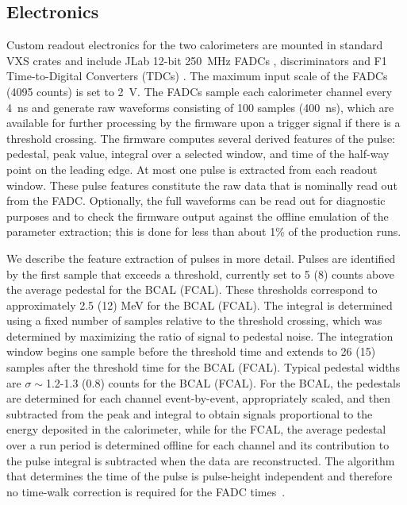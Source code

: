 \subsection{Electronics \label{sec:calelectronics}}
Custom readout electronics for the two calorimeters are mounted in standard VXS crates and include 
JLab 12-bit 250~MHz FADCs \cite{hdnote1022}, discriminators \cite{hdnote2511} and F1 Time-to-Digital Converters (TDCs) \cite{hdnote1021}. The maximum input scale of the FADCs (4095 counts) is set to 2~V.
The FADCs sample each calorimeter channel every 4~ns and generate raw waveforms consisting of 100 samples 
 (400~ns), which are available for further processing by the firmware upon a trigger signal if there is a threshold crossing. The firmware computes several derived features of the pulse: pedestal, peak value, integral over a selected window, and time of the half-way point on the leading edge. At most one pulse is extracted from each readout window. These pulse features constitute the raw data that is nominally read out from the FADC.  Optionally, the full waveforms can be read out for diagnostic purposes and to check the firmware output against the offline emulation of the parameter extraction; this is done for less than about 1\% of the production runs.
 
We describe the feature extraction of pulses in more detail.
Pulses are identified by the first sample that exceeds a threshold, currently set to 5 (8) counts above the average pedestal for the BCAL (FCAL). These thresholds correspond to approximately 2.5 (12) MeV for the BCAL (FCAL). The integral is determined using a fixed number of samples relative to the threshold crossing, which was determined by maximizing the ratio of signal to pedestal noise.  The integration window begins one sample before the threshold time and extends to 26 (15) samples after the threshold time for the BCAL (FCAL).  Typical pedestal widths are $\sigma\sim$1.2-1.3 (0.8) counts for the BCAL (FCAL).  For the BCAL, the pedestals are determined for each channel event-by-event, appropriately scaled, and then subtracted from the peak and integral to obtain signals proportional to the energy deposited in the calorimeter, while for the FCAL, the average pedestal over a run period is determined offline for each channel and its contribution to the pulse integral is subtracted when the data are reconstructed.%
 The algorithm that determines the time of the pulse is pulse-height independent and therefore no time-walk correction is required for the FADC times~\cite{Bennett:2010nf}.

